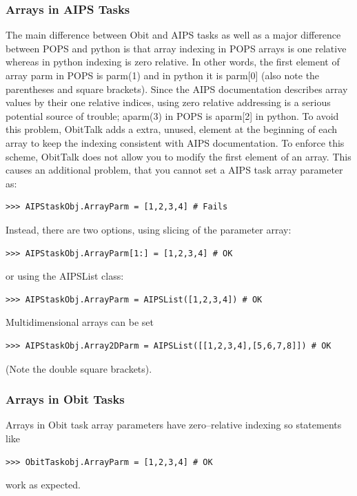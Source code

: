 \documentclass[11pt]{report}
\begin{document}
\subsubsection{Arrays in AIPS Tasks}
The main difference between Obit and AIPS tasks as well as a major
difference between POPS and python is that array indexing in POPS
arrays is one relative whereas in python indexing is zero relative.
In other words, the first element of array parm in POPS is parm(1) and
in python it is parm[0] (also note the parentheses and square
brackets).
Since the AIPS documentation describes array values by their one
relative indices, using zero relative addressing is a serious
potential source of trouble; aparm(3) in POPS is aparm[2] in python.
To avoid this problem, ObitTalk adds a extra, unused, element at the
beginning of each array to keep the indexing consistent with AIPS
documentation. 
To enforce this scheme, ObitTalk does not allow you to modify the
first element of an array.
This causes an additional problem, that you cannot set a AIPS task
array parameter as:
\begin{verbatim}
>>> AIPStaskObj.ArrayParm = [1,2,3,4] # Fails
\end{verbatim}
Instead, there are two options, using slicing of the parameter array:
\begin{verbatim}
>>> AIPStaskObj.ArrayParm[1:] = [1,2,3,4] # OK
\end{verbatim}
or using the AIPSList class:
\begin{verbatim}
>>> AIPStaskObj.ArrayParm = AIPSList([1,2,3,4]) # OK
\end{verbatim}
Multidimensional arrays can be set
\begin{verbatim}
>>> AIPStaskObj.Array2DParm = AIPSList([[1,2,3,4],[5,6,7,8]]) # OK
\end{verbatim}
(Note the double square brackets).

\subsubsection{Arrays in Obit Tasks}
Arrays in Obit task array parameters have zero--relative indexing so
statements like 
\begin{verbatim}
>>> ObitTaskobj.ArrayParm = [1,2,3,4] # OK
\end{verbatim}
work as expected.
\end{document}
